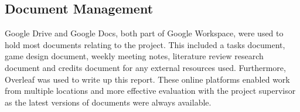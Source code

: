 \subsection{Document Management}
Google Drive and Google Docs, both part of Google Workspace, were used to hold most documents relating to the project. This included a tasks document, game design document, weekly meeting notes, literature review research document and credits document for any external resources used. Furthermore, Overleaf was used to write up this report. These online platforms enabled work from multiple locations and more effective evaluation with the project supervisor as the latest versions of documents were always available.